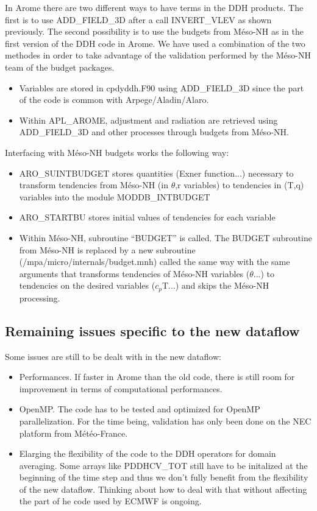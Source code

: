In Arome there are two different ways to have terms in the DDH products. The first is to use ADD\_FIELD\_3D after a call
INVERT\_VLEV as shown previously. The second possibility is to use the budgets from Méso-NH as in the first version of the DDH code in Arome.
We have used a combination of the two methodes in order to take advantage of the validation performed by the Méso-NH team of the budget packages.
\begin{itemize}
\item
Variables are stored in cpdyddh.F90 using ADD\_FIELD\_3D since the part of the code is common with Arpege/Aladin/Alaro.
\item Within APL\_AROME, adjustment and radiation are retrieved using ADD\_FIELD\_3D and other processes through budgets from Méso-NH.
\end{itemize}

Interfacing with Méso-NH budgets works the following way:
\begin{itemize}
 \item ARO\_SUINTBUDGET stores quantities (Exner function...) necessary to transform tendencies from Méso-NH
(in $\theta$,r variables) to tendencies in (T,q) variables into the module MODDB\_INTBUDGET 
 \item ARO\_STARTBU stores initial values of tendencies for each variable
 \item Within Méso-NH, subroutine ``BUDGET'' is called. The BUDGET subroutine from Méso-NH is replaced by a new subroutine
(/mpa/micro/internals/budget.mnh) called the same way with the same arguments that transforms tendencies of Méso-NH variables ($\theta$...)  to tendencies on the desired variables ($c_p$T...) and skips the Méso-NH processing.
\end{itemize}


 \subsection{Remaining issues specific to the new dataflow}

Some issues are still to be dealt with in the new dataflow:
\begin{itemize}
\item Performances. If faster in Arome than the old code, there is still room for improvement in terms of computational performances.
\item OpenMP. The code has to be tested and optimized for OpenMP parallelization. For the time being, validation has only been done on the NEC platform from Météo-France. 
\item Elarging the flexibility of the code to the DDH operators for domain averaging. Some arrays like PDDHCV\_TOT still have to be initalized at the beginning of the time step and thus we don't fully benefit from the flexibility of the new dataflow. Thinking about how to deal with that without affecting the part of he code used by ECMWF is ongoing.
\end{itemize}



